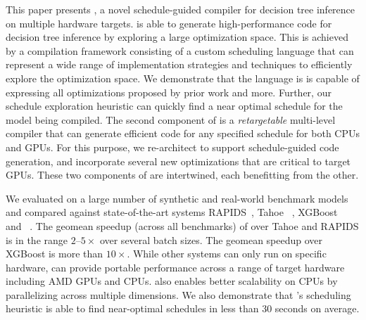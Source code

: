 This paper presents \Treebeard{}, a novel schedule-guided compiler
for decision tree inference on multiple hardware targets. \Treebeard{} is able to 
generate high-performance code for decision tree inference by exploring a large optimization space. 
This is achieved by a compilation framework consisting of a 
custom scheduling language that can represent a wide range of 
implementation strategies and techniques to efficiently explore
the optimization space. We demonstrate that the language is 
is capable of expressing all optimizations proposed by prior work and more.
Further, our schedule exploration heuristic can quickly find a near 
optimal schedule for the model being compiled. 
The second component of \Treebeard{} is a \emph{retargetable} multi-level compiler that can generate efficient code 
for any specified schedule for both CPUs and GPUs. For this purpose, we re-architect \TreebeardOLD{} to
support schedule-guided code generation, and incorporate several new optimizations that are critical to target GPUs. 
These two components of \Treebeard{} are intertwined, each benefitting from the other.

We evaluated \Treebeard{} on a large number of synthetic and real-world 
benchmark models and compared against state-of-the-art systems RAPIDS~\cite{RAPIDS}, Tahoe~\cite{Tahoe}
, XGBoost~\cite{XGBoost} and \TreebeardOLD{}~\cite{Treebeard}. 
The geomean speedup (across all benchmarks) of \Treebeard{} over
Tahoe and RAPIDS is in the range $2$--$5\times$ over several batch sizes. The geomean speedup over
XGBoost is more than $10\times$. While other systems can only run on specific hardware,
\Treebeard{} can provide portable performance across a range of target hardware
including AMD GPUs and CPUs. \Treebeard{} also enables better scalability on CPUs by parallelizing 
across multiple dimensions. We also demonstrate that \Treebeard{}'s scheduling heuristic is able to 
find near-optimal schedules in less than 30 seconds on average.


